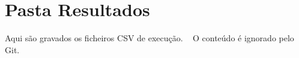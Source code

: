 \chapter{Pasta Resultados}
\hypertarget{index}{}\label{index}
\label{index_md_Adversa_2Teste_2Resultados_2README}%
%
Aqui são gravados os ficheiros CSV de execução. ~\newline
 O conteúdo é ignorado pelo Git. 
